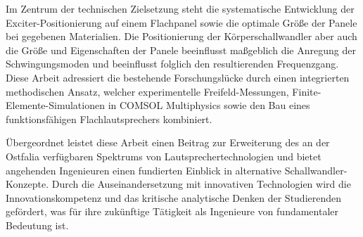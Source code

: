 Im Zentrum der technischen Zielsetzung steht die systematische Entwicklung der Exciter-Positionierung auf einem Flachpanel sowie die optimale Größe der Panele bei gegebenen Materialien. Die Positionierung der Körperschallwandler aber auch die Größe und Eigenschaften der Panele beeinflusst maßgeblich die Anregung der Schwingungsmoden und beeinflusst folglich den resultierenden Frequenzgang. Diese Arbeit adressiert die bestehende Forschungslücke durch einen integrierten methodischen Ansatz, welcher experimentelle Freifeld-Messungen, Finite-Elemente-Simulationen in COMSOL Multiphysics sowie den Bau eines funktionsfähigen Flachlautsprechers kombiniert.

Übergeordnet leistet diese Arbeit einen Beitrag zur Erweiterung des an der Ostfalia verfügbaren Spektrums von Lautsprechertechnologien und bietet angehenden Ingenieuren einen fundierten Einblick in alternative Schallwandler-Konzepte. Durch die Auseinandersetzung mit innovativen Technologien wird die Innovationskompetenz und das kritische analytische Denken der Studierenden gefördert, was für ihre zukünftige Tätigkeit als Ingenieure von fundamentaler Bedeutung ist.

